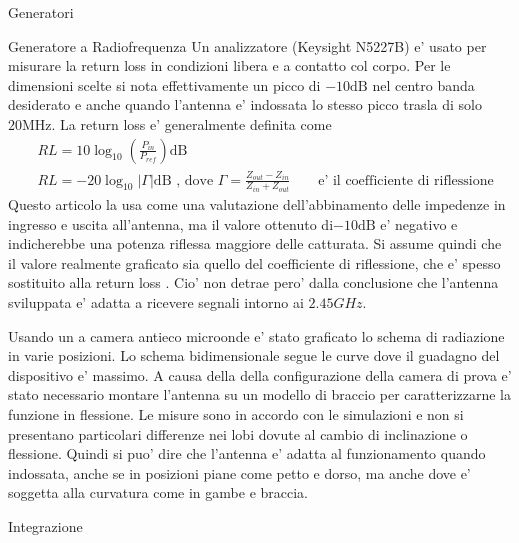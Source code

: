 \begin{section}{Generatori}
\begin{subsection}{Generatore a Radiofrequenza}
        {\color{red}
        Un analizzatore (Keysight N5227B) e' usato per misurare la return loss in condizioni libera e a contatto col corpo. Per le dimensioni scelte si nota effettivamente un picco di \(-10\mathrm{dB}\) nel centro banda desiderato e anche quando l'antenna e' indossata lo stesso picco trasla di solo \(20\mathrm{MHz}\).
        La return loss e' generalmente definita come 
        \begin{equation}
            \begin{aligned}
            &RL=10\log_{10}\left( \frac{P_{in}}{P_{ref}} \right) \mathrm{dB}\\
            &RL=-20\log_{10}\left|\Gamma\right|\mathrm{dB} \textrm{ , dove }\Gamma=\frac{Z_{out}-Z_{in}}{Z_{in}+Z_{out}}\hspace{2em} \textrm{e' il coefficiente di riflessione}
            \end{aligned}
        \end{equation}
        Questo articolo la usa come una valutazione dell'abbinamento delle impedenze in ingresso e uscita all'antenna, ma il valore ottenuto di\(-10\mathrm{dB}\) e' negativo e indicherebbe una potenza riflessa maggiore delle catturata. Si assume quindi che il valore realmente graficato sia quello del coefficiente di riflessione, che e' spesso sostituito alla return loss \cite{birdDefinitionMisuseReturn2009}. Cio' non detrae pero' dalla conclusione che l'antenna sviluppata e' adatta a ricevere segnali intorno ai \(2.45GHz\).
        }
        
        Usando un a camera antieco microonde e' stato graficato lo schema di radiazione in varie posizioni. Lo schema bidimensionale segue le curve dove il guadagno del dispositivo e' massimo. A causa della della configurazione della camera di prova e' stato necessario montare l'antenna su un modello di braccio per caratterizzarne la funzione in flessione. Le misure sono in accordo con le simulazioni e non si presentano particolari differenze nei lobi dovute al cambio di inclinazione o flessione. Quindi si puo' dire che l'antenna e' adatta al funzionamento quando indossata, anche se in posizioni piane come petto e dorso, ma anche dove e' soggetta alla curvatura come in gambe e braccia.

    \end{subsection}

    \begin{subsection}{Integrazione}
        
    \end{subsection}

\end{section}